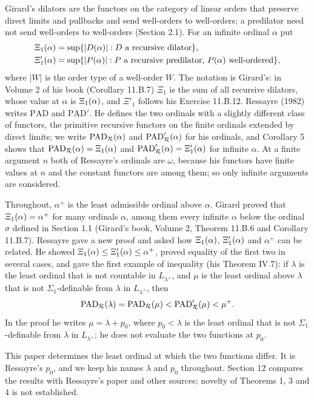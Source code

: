\documentclass[11pt]{article}
\begin{document}
Girard's dilators are the functors on the category of linear orders that preserve direct limits and pullbacks and
send well-orders to well-orders; a predilator need not send well-orders to well-orders (Section 2.1). For an
infinite ordinal $\alpha$ put
\begin{align*}
\Xi_1(\alpha) &= \sup\{|D(\alpha)| : D \text{ a recursive dilator}\}, \\
\Xi'_1(\alpha) &= \sup\{|P(\alpha)| : P \text{ a recursive predilator, } P(\alpha) \text{ well-ordered}\},
\end{align*}
where $|W|$ is the order type of a well-order $W$. The notation is Girard's: in Volume 2 of his book (Corollary 11.B.7) $\Xi_1$ is the sum of all
recursive dilators, whose value at $\alpha$ is $\Xi_1(\alpha)$, and $\Xi'_1$ follows his Exercise 11.B.12. Ressayre
(1982) writes $\mathrm{PAD}$ and $\mathrm{PAD}'$. He defines the two ordinals
with a slightly different class of functors, the primitive recursive functors on the finite ordinals extended by
direct limits; we write $\mathrm{PAD}_{\mathcal R}(\alpha)$ and $\mathrm{PAD}'_{\mathcal R}(\alpha)$ for his ordinals, and Corollary 5 shows that
$\mathrm{PAD}_{\mathcal R}(\alpha) = \Xi_1(\alpha)$ and $\mathrm{PAD}'_{\mathcal R}(\alpha) = \Xi'_1(\alpha)$ for infinite $\alpha$. At a finite argument $n$ both
of Ressayre's ordinals are $\omega$, because his functors have finite values at $n$ and the constant functors are
among them; so only infinite arguments are considered.

Throughout, $\alpha^+$ is the least admissible ordinal above $\alpha$. Girard proved that
$\Xi_1(\alpha) = \alpha^+$ for many ordinals $\alpha$, among them every infinite $\alpha$ below the ordinal $\sigma$
defined in Section 1.1 (Girard's book, Volume 2, Theorem 11.B.6 and Corollary 11.B.7). Ressayre gave a new proof and asked how $\Xi_1(\alpha)$, $\Xi'_1(\alpha)$ and $\alpha^+$ can be
related. He showed $\Xi_1(\alpha) \le \Xi'_1(\alpha) \le \alpha^+$, proved equality of the first two in several cases,
and gave the first example of inequality (his Theorem IV.7): if $\lambda$ is the least ordinal that is not
countable in $L_{\lambda^+}$, and $\mu$ is the least ordinal above $\lambda$ that is not $\Sigma_1$-definable from
$\lambda$ in $L_{\lambda^+}$, then
\[ \mathrm{PAD}_{\mathcal R}(\lambda) = \mathrm{PAD}_{\mathcal R}(\mu) < \mathrm{PAD}'_{\mathcal R}(\mu) < \mu^+ . \]
In the proof he writes $\mu = \lambda + p_0$, where $p_0 < \lambda$ is the least ordinal that is not
$\Sigma_1$-definable from $\lambda$ in $L_{\lambda^+}$; he does not evaluate the two functions at $p_0$.

This paper determines the least ordinal at which the two functions differ. It is Ressayre's $p_0$, and we keep his
names $\lambda$ and $p_0$ throughout. Section 12 compares the results with Ressayre's paper and other sources;
novelty of Theorems 1, 3 and 4 is not established.
\end{document}
